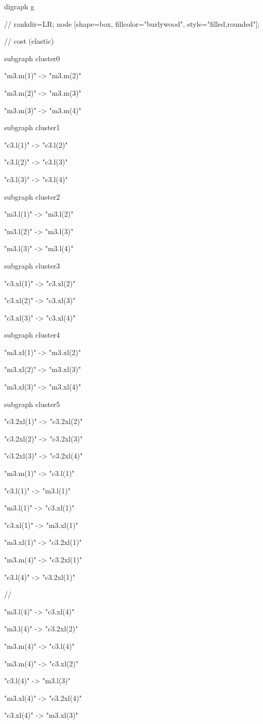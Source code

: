 digraph g{
  // rankdir=LR;
  node [shape=box, fillcolor="burlywood", style="filled,rounded"];
   
  // cost (elastic)

  subgraph cluster0 {
    "m3.m(1)" -> "m3.m(2)"

    "m3.m(2)" -> "m3.m(3)"

    "m3.m(3)" -> "m3.m(4)"
  }

  subgraph cluster1 {
     "c3.l(1)" -> "c3.l(2)"

    "c3.l(2)" -> "c3.l(3)"

    "c3.l(3)" -> "c3.l(4)"
  }

  subgraph cluster2 {
    "m3.l(1)" -> "m3.l(2)"

    "m3.l(2)" -> "m3.l(3)"

    "m3.l(3)" -> "m3.l(4)"
  }
  
  subgraph cluster3 {
    "c3.xl(1)" -> "c3.xl(2)"

    "c3.xl(2)" -> "c3.xl(3)"

    "c3.xl(3)" -> "c3.xl(4)"

  }
  
  subgraph cluster4 {
    "m3.xl(1)" -> "m3.xl(2)"

    "m3.xl(2)" -> "m3.xl(3)"

    "m3.xl(3)" -> "m3.xl(4)"
  }
  
  subgraph cluster5 {
    "c3.2xl(1)" -> "c3.2xl(2)"

    "c3.2xl(2)" -> "c3.2xl(3)"

    "c3.2xl(3)" -> "c3.2xl(4)"
  }  

  "m3.m(1)" -> "c3.l(1)" 

  "c3.l(1)" -> "m3.l(1)" 

  "m3.l(1)" -> "c3.xl(1)"

  "c3.xl(1)" -> "m3.xl(1)"

  "m3.xl(1)" -> "c3.2xl(1)"
  
  "m3.m(4)" -> "c3.2xl(1)"

  "c3.l(4)" -> "c3.2xl(1)"

  //
 
  "m3.l(4)" -> "c3.xl(4)"

  "m3.l(4)" -> "c3.2xl(2)"

  "m3.m(4)" -> "c3.l(4)"

  "m3.m(4)" -> "c3.xl(2)"
  
  "c3.l(4)" -> "m3.l(3)"

  "m3.xl(4)" -> "c3.2xl(4)" 

  "c3.xl(4)" -> "m3.xl(3)"

}